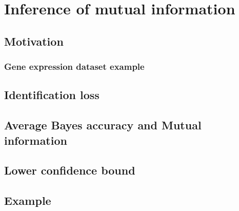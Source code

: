 
\chapter{Inference of mutual information} %

\label{Chapter4} %

\section{Motivation}

\subsection{Gene expression dataset example}

\section{Identification loss}

\section{Average Bayes accuracy and Mutual information}

\section{Lower confidence bound}

\section{Example}

